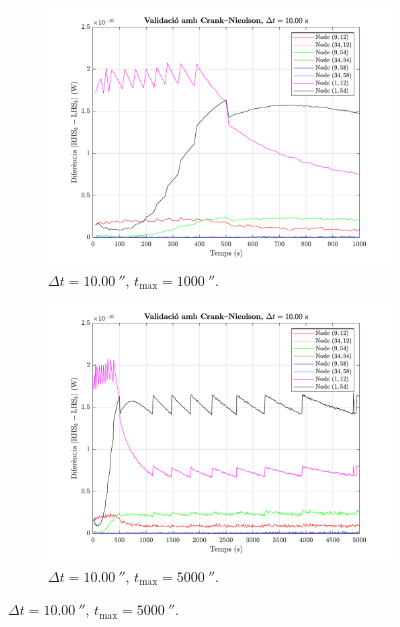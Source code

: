 \begin{figure}[ht]
\begin{subfigure}{.5\textwidth}
		\label{fig:validacio_04}
	\end{subfigure}
	\begin{subfigure}{.5\textwidth}
		\centering
		\includegraphics[width=.95\linewidth]{imagenes/03_validacio/validacio_05.pdf}
		\vspace{-7pt}
		\caption{$\Delta t = 10.00 \ \second$, $t_\text{max} = 1000 \ \second$.}
		\label{fig:validacio_05}
	\end{subfigure}%
	\begin{subfigure}{.5\textwidth}
		\centering
		\includegraphics[width=.95\linewidth]{imagenes/03_validacio/validacio_06.pdf}
		\vspace{-7pt}
		\caption{$\Delta t = 10.00 \ \second$, $t_\text{max} = 5000 \ \second$.}

\end{subfigure}
\end{figure}
